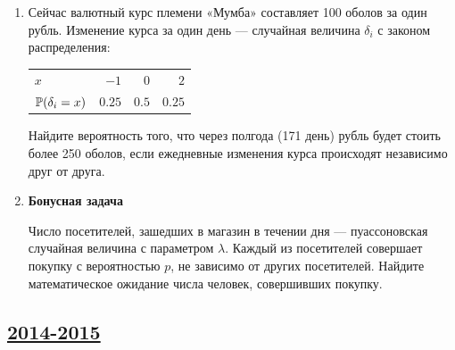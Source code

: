 \begin{enumerate}
\item Сейчас валютный курс племени «Мумба» составляет 100 оболов за один рубль.
Изменение курса за один день — случайная величина $\delta_i$ с законом распределения:

\begin{center}
\begin{tabular}{lrrr}
\toprule
$x$ & $-1$ & $0$ & $2$ \\
$\P(\delta_i = x)$ & $0.25$ & $0.5$ & $0.25$ \\
\bottomrule
\end{tabular}
\end{center}

Найдите вероятность того, что через полгода (171 день) рубль будет стоить более
250 оболов, если ежедневные изменения курса происходят независимо друг от друга.

\item \textbf{Бонусная задача}

Число посетителей, зашедших в магазин в течении дня — пуассоновская случайная
величина с параметром $\lambda$. Каждый из посетителей совершает покупку с
вероятностью $p$, не зависимо от других посетителей. Найдите математическое ожидание
числа человек, совершивших покупку.
\end{enumerate}



\newpage
\subsection[2014-2015]{\hyperref[sec:sol_kr_02_2014_2015]{2014-2015}}
\label{sec:kr_02_2014_2015}

